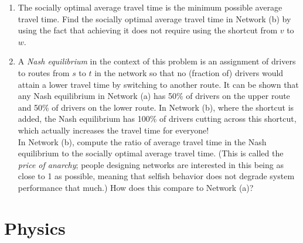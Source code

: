 \documentclass{article}
\begin{document}
\begin{enumerate}
    \begin{enumerate}
        \item The socially optimal average travel time is the minimum possible average travel time. Find the socially optimal average travel time in Network (b) by using the fact that achieving it does not require using the shortcut from $v$ to $w$.

        \vfill

        \item A \textit{Nash equilibrium} in the context of this problem is an assignment of drivers to routes from $s$ to $t$ in the network so that no (fraction of) drivers would attain a lower travel time by switching to another route. It can be shown that any Nash equilibrium in Network (a) has 50\% of drivers on the upper route and 50\% of drivers on the lower route. In Network (b), where the shortcut is added, the Nash equilibrium has 100\% of drivers cutting across this shortcut, which actually increases the travel time for everyone! \\

        In Network (b), compute the ratio of average travel time in the Nash equilibrium to the socially optimal average travel time. (This is called the \textit{price of anarchy}; people designing networks are interested in this being as close to 1 as possible, meaning that selfish behavior does not degrade system performance that much.) How does this compare to Network (a)? 

        \vfill
    \end{enumerate}

    
\end{enumerate}

\newpage

\section{Physics}
\end{document}
